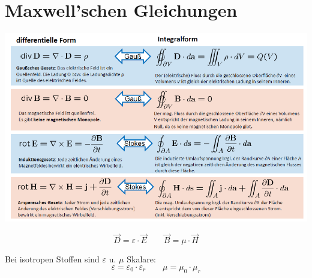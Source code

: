 \section{Maxwell’schen Gleichungen}

\includegraphics[width=\columnwidth]{Figures/Integralsatz.png}

\[
    \vec{D} = \varepsilon \cdot \vec{E} \qquad
    \vec{B} = \mu \cdot \vec{H}
\]

Bei isotropen Stoffen sind $\varepsilon$ u. $\mu$ Skalare:
\[
    \varepsilon = \varepsilon_0 \cdot \varepsilon_r \qquad \mu = \mu_0 \cdot \mu_r
\]

